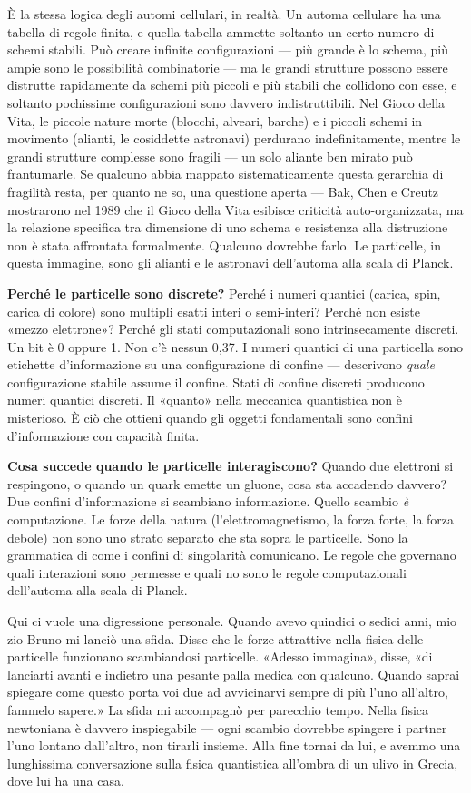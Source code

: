 \documentclass[11pt, twoside, openright]{book}
\begin{document}
È la stessa logica degli automi cellulari, in realtà. Un automa cellulare ha una tabella di regole finita, e quella tabella ammette soltanto un certo numero di schemi stabili. Può creare infinite configurazioni --- più grande è lo schema, più ampie sono le possibilità combinatorie --- ma le grandi strutture possono essere distrutte rapidamente da schemi più piccoli e più stabili che collidono con esse, e soltanto pochissime configurazioni sono davvero indistruttibili. Nel Gioco della Vita, le piccole nature morte (blocchi, alveari, barche) e i piccoli schemi in movimento (alianti, le cosiddette astronavi) perdurano indefinitamente, mentre le grandi strutture complesse sono fragili --- un solo aliante ben mirato può frantumarle. Se qualcuno abbia mappato sistematicamente questa gerarchia di fragilità resta, per quanto ne so, una questione aperta --- Bak, Chen e Creutz mostrarono nel 1989 che il Gioco della Vita esibisce criticità auto-organizzata, ma la relazione specifica tra dimensione di uno schema e resistenza alla distruzione non è stata affrontata formalmente. Qualcuno dovrebbe farlo. Le particelle, in questa immagine, sono gli alianti e le astronavi dell'automa alla scala di Planck.

\textbf{Perché le particelle sono discrete?} Perché i numeri quantici (carica, spin, carica di colore) sono multipli esatti interi o semi-interi? Perché non esiste «mezzo elettrone»? Perché gli stati computazionali sono intrinsecamente discreti. Un bit è 0 oppure 1. Non c'è nessun 0,37. I numeri quantici di una particella sono etichette d'informazione su una configurazione di confine --- descrivono \textit{quale} configurazione stabile assume il confine. Stati di confine discreti producono numeri quantici discreti. Il «quanto» nella meccanica quantistica non è misterioso. È ciò che ottieni quando gli oggetti fondamentali sono confini d'informazione con capacità finita.

\textbf{Cosa succede quando le particelle interagiscono?} Quando due elettroni si respingono, o quando un quark emette un gluone, cosa sta accadendo davvero? Due confini d'informazione si scambiano informazione. Quello scambio \textit{è} computazione. Le forze della natura (l'elettromagnetismo, la forza forte, la forza debole) non sono uno strato separato che sta sopra le particelle. Sono la grammatica di come i confini di singolarità comunicano. Le regole che governano quali interazioni sono permesse e quali no sono le regole computazionali dell'automa alla scala di Planck.

Qui ci vuole una digressione personale. Quando avevo quindici o sedici anni, mio zio Bruno mi lanciò una sfida. Disse che le forze attrattive nella fisica delle particelle funzionano scambiandosi particelle. «Adesso immagina», disse, «di lanciarti avanti e indietro una pesante palla medica con qualcuno. Quando saprai spiegare come questo porta voi due ad avvicinarvi sempre di più l'uno all'altro, fammelo sapere.» La sfida mi accompagnò per parecchio tempo. Nella fisica newtoniana è davvero inspiegabile --- ogni scambio dovrebbe spingere i partner l'uno lontano dall'altro, non tirarli insieme. Alla fine tornai da lui, e avemmo una lunghissima conversazione sulla fisica quantistica all'ombra di un ulivo in Grecia, dove lui ha una casa.
\end{document}
